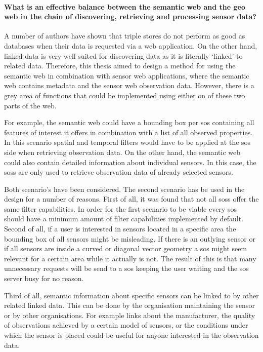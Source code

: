 \paragraph{What is an effective balance between the semantic web and the geo web in the chain of discovering, retrieving and processing sensor data?}\mbox{}

A number of authors have shown that triple stores do not perform as good as databases when their data is requested via a web application. On the other hand, linked data is very well suited for discovering data as it is literally `linked' to related data. Therefore, this thesis aimed to design a method for using the semantic web in combination with sensor web applications, where the semantic web contains metadata and the sensor web observation data. However, there is a grey area of functions that could be implemented using either on of these two parts of the web. 

For example, the semantic web could have a bounding box per \ac{sos} containing all features of interest it offers in combination with a list of all observed properties. In this scenario spatial and temporal filters would have to be applied at the \ac{sos} side when retrieving observation data. On the other hand, the semantic web could also contain detailed information about individual sensors. In this case, the \aclp{sos} are only used to retrieve observation data of already selected sensors.

Both scenario's have been considered. The second scenario has be used in the design for a number of reasons. First of all, it was found that not all \aclp{sos} offer the same filter capabilities. In order for the first scenario to be viable every \ac{sos} should have a minimum amount of filter capabilities implemented by default. 
Second of all, if a user is interested in sensors located in a specific area the bounding box of all sensors might be misleading. If there is an outlying sensor or if all sensors are inside a curved or diagonal vector geometry a \ac{sos} might seem relevant for a certain area while it actually is not. The result of this is that many unnecessary requests will be send to a \ac{sos} keeping the user waiting and the \ac{sos} server busy for no reason. 

Third of all, semantic information about specific sensors can be linked to by other related linked data. This can be done by the organisation maintaining the sensor or by other organisations. For example links about the manufacturer, the quality of observations achieved by a certain model of sensors, or the conditions under which the sensor is placed could be useful for anyone interested in the observation data. 

